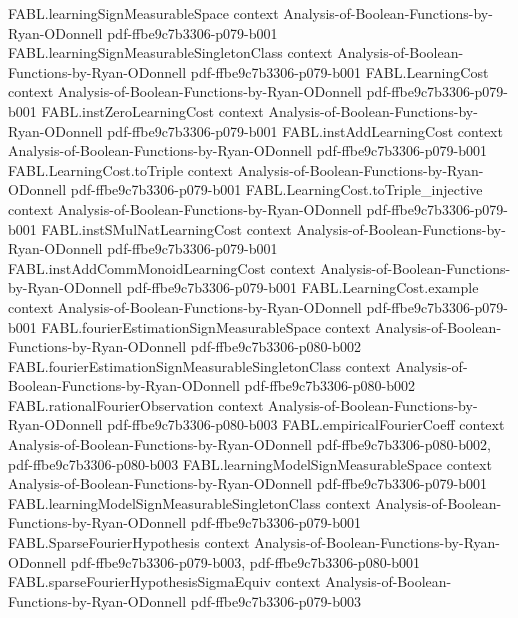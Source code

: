\begin{theorem}
\proofstep
  {FABL.learningSignMeasurableSpace}
  {context}
  {Analysis-of-Boolean-Functions-by-Ryan-ODonnell}
  {pdf-ffbe9c7b3306-p079-b001}
\proofstep
  {FABL.learningSignMeasurableSingletonClass}
  {context}
  {Analysis-of-Boolean-Functions-by-Ryan-ODonnell}
  {pdf-ffbe9c7b3306-p079-b001}
\proofstep
  {FABL.LearningCost}
  {context}
  {Analysis-of-Boolean-Functions-by-Ryan-ODonnell}
  {pdf-ffbe9c7b3306-p079-b001}
\proofstep
  {FABL.instZeroLearningCost}
  {context}
  {Analysis-of-Boolean-Functions-by-Ryan-ODonnell}
  {pdf-ffbe9c7b3306-p079-b001}
\proofstep
  {FABL.instAddLearningCost}
  {context}
  {Analysis-of-Boolean-Functions-by-Ryan-ODonnell}
  {pdf-ffbe9c7b3306-p079-b001}
\proofstep
  {FABL.LearningCost.toTriple}
  {context}
  {Analysis-of-Boolean-Functions-by-Ryan-ODonnell}
  {pdf-ffbe9c7b3306-p079-b001}
\proofstep
  {FABL.LearningCost.toTriple_injective}
  {context}
  {Analysis-of-Boolean-Functions-by-Ryan-ODonnell}
  {pdf-ffbe9c7b3306-p079-b001}
\proofstep
  {FABL.instSMulNatLearningCost}
  {context}
  {Analysis-of-Boolean-Functions-by-Ryan-ODonnell}
  {pdf-ffbe9c7b3306-p079-b001}
\proofstep
  {FABL.instAddCommMonoidLearningCost}
  {context}
  {Analysis-of-Boolean-Functions-by-Ryan-ODonnell}
  {pdf-ffbe9c7b3306-p079-b001}
\proofstep
  {FABL.LearningCost.example}
  {context}
  {Analysis-of-Boolean-Functions-by-Ryan-ODonnell}
  {pdf-ffbe9c7b3306-p079-b001}
\proofstep
  {FABL.fourierEstimationSignMeasurableSpace}
  {context}
  {Analysis-of-Boolean-Functions-by-Ryan-ODonnell}
  {pdf-ffbe9c7b3306-p080-b002}
\proofstep
  {FABL.fourierEstimationSignMeasurableSingletonClass}
  {context}
  {Analysis-of-Boolean-Functions-by-Ryan-ODonnell}
  {pdf-ffbe9c7b3306-p080-b002}
\proofstep
  {FABL.rationalFourierObservation}
  {context}
  {Analysis-of-Boolean-Functions-by-Ryan-ODonnell}
  {pdf-ffbe9c7b3306-p080-b003}
\proofstep
  {FABL.empiricalFourierCoeff}
  {context}
  {Analysis-of-Boolean-Functions-by-Ryan-ODonnell}
  {pdf-ffbe9c7b3306-p080-b002,
    pdf-ffbe9c7b3306-p080-b003}
\proofstep
  {FABL.learningModelSignMeasurableSpace}
  {context}
  {Analysis-of-Boolean-Functions-by-Ryan-ODonnell}
  {pdf-ffbe9c7b3306-p079-b001}
\proofstep
  {FABL.learningModelSignMeasurableSingletonClass}
  {context}
  {Analysis-of-Boolean-Functions-by-Ryan-ODonnell}
  {pdf-ffbe9c7b3306-p079-b001}
\proofstep
  {FABL.SparseFourierHypothesis}
  {context}
  {Analysis-of-Boolean-Functions-by-Ryan-ODonnell}
  {pdf-ffbe9c7b3306-p079-b003,
    pdf-ffbe9c7b3306-p080-b001}
\proofstep
  {FABL.sparseFourierHypothesisSigmaEquiv}
  {context}
  {Analysis-of-Boolean-Functions-by-Ryan-ODonnell}
  {pdf-ffbe9c7b3306-p079-b003}

\end{theorem}

